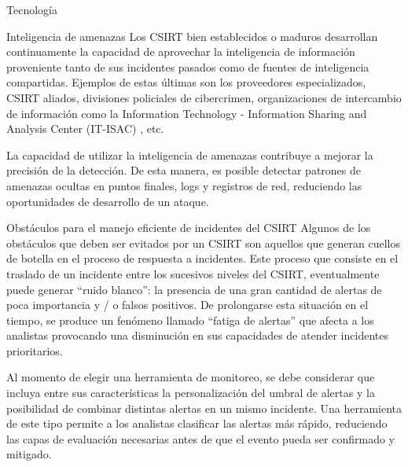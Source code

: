 \begin{section}{Tecnología}
        \begin{subsection}{Inteligencia de amenazas}
        Los CSIRT bien establecidos o maduros desarrollan continuamente la capacidad de aprovechar la inteligencia de información proveniente tanto de sus incidentes pasados como de fuentes de inteligencia compartidas. Ejemplos de estas últimas son los proveedores especializados, CSIRT aliados, divisiones policiales de cibercrimen, organizaciones de intercambio de información como la Information Technology - Information Sharing and Analysis Center (IT-ISAC) \cite{it_isac}, etc. \par
        La capacidad de utilizar la inteligencia de amenazas contribuye a mejorar la precisión de la detección. De esta manera, es posible detectar patrones de amenazas ocultas en puntos finales, logs y registros de red, reduciendo las oportunidades de desarrollo de un ataque.
        \end{subsection}
        \pagebreak
        \begin{subsection}{Obstáculos para el manejo eficiente de incidentes del CSIRT}
        Algunos de los obstáculos que deben ser evitados por un CSIRT son aquellos que generan cuellos de botella en el proceso de respuesta a incidentes.  Este proceso que consiste en el traslado de un incidente entre los sucesivos niveles del CSIRT, eventualmente puede generar “ruido blanco”: la presencia de una gran cantidad de alertas de poca importancia y / o falsos positivos. De prolongarse esta situación en el tiempo, se produce un fenómeno llamado “fatiga de alertas” que afecta a los analistas provocando una disminución en sus capacidades de atender incidentes prioritarios. \par
        Al momento de elegir una herramienta de monitoreo, se debe considerar que incluya entre sus características la personalización del umbral de alertas y la posibilidad de combinar distintas alertas en un mismo incidente. Una herramienta de este tipo permite a los analistas clasificar las alertas más rápido, reduciendo las capas de evaluación necesarias antes de que el evento pueda ser confirmado y mitigado. 
        \end{subsection}
   \end{section}
      
